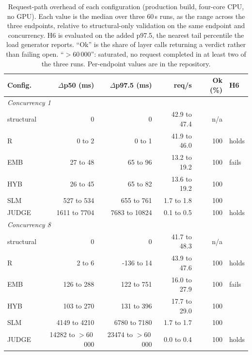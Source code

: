 \begin{table}[t]
\caption{Request-path overhead of each configuration (production build, four-core CPU, no GPU). Each
value is the median over three 60\,s runs, as the range across the three endpoints, relative to
structural-only validation on the same endpoint and concurrency. H6 is evaluated on the added p97.5,
the nearest tail percentile the load generator reports. ``Ok'' is the share of layer calls returning a
verdict rather than failing open. ``$>$60\,000'': saturated, no request completed in at least two of
the three runs. Per-endpoint values are in the repository.}
\label{tab:e4}
\centering
\footnotesize
\setlength{\tabcolsep}{1.5pt}
\begin{tabular}{lrrrrl}
\toprule
Config. & $\Delta$p50 (ms) & $\Delta$p97.5 (ms) & req/s & Ok (\%) & H6 \\
\midrule
\multicolumn{6}{l}{\emph{Concurrency 1}} \\
structural & 0 & 0 & 42.9 to 47.4 & n/a &  \\
R & 0 to 2 & 0 to 1 & 41.9 to 46.0 & 100 & holds \\
EMB & 27 to 48 & 65 to 96 & 13.2 to 19.2 & 100 & fails \\
HYB & 26 to 45 & 65 to 82 & 13.6 to 19.2 & 100 &  \\
SLM & 527 to 534 & 655 to 761 & 1.7 to 1.8 & 100 &  \\
JUDGE & 1611 to 7704 & 7683 to 10824 & 0.1 to 0.5 & 100 & holds \\
\multicolumn{6}{l}{\emph{Concurrency 8}} \\
structural & 0 & 0 & 41.7 to 48.3 & n/a &  \\
R & 2 to 6 & -136 to 14 & 43.9 to 47.6 & 100 & holds \\
EMB & 126 to 288 & 122 to 751 & 16.0 to 27.9 & 100 & fails \\
HYB & 103 to 270 & 131 to 396 & 17.7 to 29.0 & 100 &  \\
SLM & 4149 to 4210 & 6780 to 7180 & 1.7 to 1.7 & 100 &  \\
JUDGE & 14282 to $>$60\,000 & 23474 to $>$60\,000 & 0.0 to 0.4 & 100 & holds \\
\bottomrule
\end{tabular}
\end{table}
